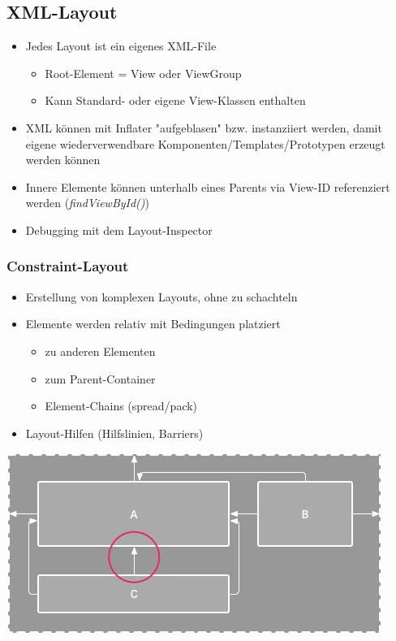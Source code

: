 \documentclass[a4paper]{article}
\begin{document}
\subsection{XML-Layout}
\begin{itemize}
	\item Jedes Layout ist ein eigenes XML-File
	\begin{itemize}
		\item Root-Element = View oder ViewGroup
		\item Kann Standard- oder eigene View-Klassen enthalten
	\end{itemize}
	\item XML können mit Inflater "aufgeblasen" bzw. instanziiert werden, damit eigene wiederverwendbare Komponenten/Templates/Prototypen erzeugt werden können
	\item Innere Elemente können unterhalb eines Parents via View-ID referenziert werden (\textit{findViewById()})
	\item Debugging mit dem Layout-Inspector	
\end{itemize}

\subsubsection{Constraint-Layout}

\begin{multicols}{2}
\begin{itemize}
	\item Erstellung von komplexen Layouts, ohne zu schachteln
	\item Elemente werden relativ mit Bedingungen platziert
	\begin{itemize}
		\item zu anderen Elementen
		\item zum Parent-Container
		\item Element-Chains (spread/pack)
	\end{itemize}
	\item Layout-Hilfen (Hilfslinien, Barriers)
\end{itemize}
\columnbreak
\begin{minipage}[c]{\columnwidth}
	\centering
	\includegraphics[width=0.7\linewidth]{img/constraintlayout.jpg}
\end{minipage}
\end{multicols}
\end{document}
